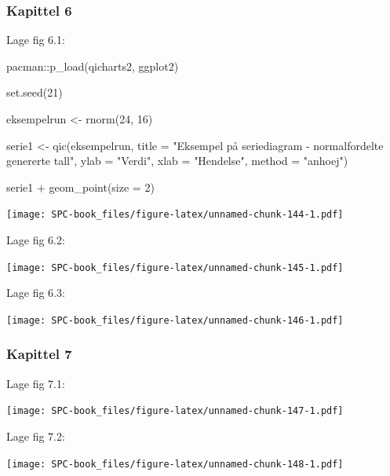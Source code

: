 \documentclass[
]{book}
\newenvironment{Shaded}{\begin{snugshade}}{\end{snugshade}}
\newcommand{\AttributeTok}[1]{\textcolor[rgb]{0.77,0.63,0.00}{#1}}
\newcommand{\DecValTok}[1]{\textcolor[rgb]{0.00,0.00,0.81}{#1}}
\newcommand{\FunctionTok}[1]{\textcolor[rgb]{0.00,0.00,0.00}{#1}}
\newcommand{\NormalTok}[1]{#1}
\newcommand{\OtherTok}[1]{\textcolor[rgb]{0.56,0.35,0.01}{#1}}
\newcommand{\SpecialCharTok}[1]{\textcolor[rgb]{0.00,0.00,0.00}{#1}}
\newcommand{\StringTok}[1]{\textcolor[rgb]{0.31,0.60,0.02}{#1}}
\begin{document}
\hypertarget{kapittel-6}{%
\subsubsection*{Kapittel 6}\label{kapittel-6}}

Lage fig 6.1:

\begin{Shaded}
\begin{Highlighting}[]
\NormalTok{pacman}\SpecialCharTok{::}\FunctionTok{p\_load}\NormalTok{(qicharts2, ggplot2)}

\FunctionTok{set.seed}\NormalTok{(}\DecValTok{21}\NormalTok{)}

\NormalTok{eksempelrun }\OtherTok{\textless{}{-}} \FunctionTok{rnorm}\NormalTok{(}\DecValTok{24}\NormalTok{, }\DecValTok{16}\NormalTok{)}

\NormalTok{serie1 }\OtherTok{\textless{}{-}} \FunctionTok{qic}\NormalTok{(eksempelrun, }\AttributeTok{title =} \StringTok{"Eksempel på seriediagram {-} normalfordelte genererte tall"}\NormalTok{, }\AttributeTok{ylab =} \StringTok{"Verdi"}\NormalTok{, }\AttributeTok{xlab =} \StringTok{"Hendelse"}\NormalTok{,   }\AttributeTok{method =} \StringTok{"anhoej"}\NormalTok{)}

\NormalTok{serie1 }\SpecialCharTok{+} \FunctionTok{geom\_point}\NormalTok{(}\AttributeTok{size =} \DecValTok{2}\NormalTok{)}
\end{Highlighting}
\end{Shaded}

\texttt{[image: SPC-book\_files/figure-latex/unnamed-chunk-144-1.pdf]}

Lage fig 6.2:

\texttt{[image: SPC-book\_files/figure-latex/unnamed-chunk-145-1.pdf]}

Lage fig 6.3:

\texttt{[image: SPC-book\_files/figure-latex/unnamed-chunk-146-1.pdf]}

\hypertarget{kapittel-7}{%
\subsubsection*{Kapittel 7}\label{kapittel-7}}

Lage fig 7.1:

\texttt{[image: SPC-book\_files/figure-latex/unnamed-chunk-147-1.pdf]}

Lage fig 7.2:

\texttt{[image: SPC-book\_files/figure-latex/unnamed-chunk-148-1.pdf]}
\end{document}
